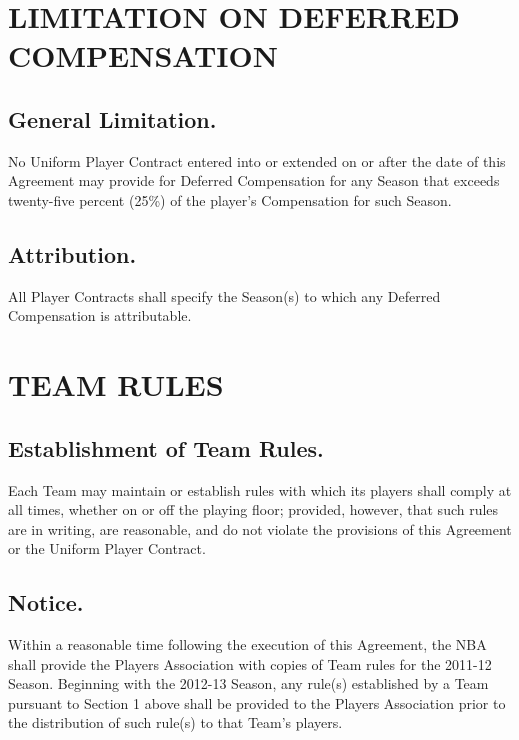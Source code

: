 \documentclass[
]{book}
\begin{document}
\hypertarget{limitation-on-deferred-compensation}{%
\chapter{LIMITATION ON DEFERRED COMPENSATION}\label{limitation-on-deferred-compensation}}

\hypertarget{general-limitation.-1}{%
\section{General Limitation.}\label{general-limitation.-1}}

No Uniform Player Contract entered into or extended on or after the date of this Agreement may provide for Deferred Compensation for any Season that exceeds twenty-five percent (25\%) of the player's Compensation for such Season.

\hypertarget{attribution.}{%
\section{Attribution.}\label{attribution.}}

All Player Contracts shall specify the Season(s) to which any Deferred Compensation is attributable.

\hypertarget{team-rules}{%
\chapter{TEAM RULES}\label{team-rules}}

\hypertarget{establishment-of-team-rules.}{%
\section{Establishment of Team Rules.}\label{establishment-of-team-rules.}}

Each Team may maintain or establish rules with which its players shall comply at all times, whether on or off the playing floor; provided, however, that such rules are in writing, are reasonable, and do not violate the provisions of this Agreement or the Uniform Player Contract.

\hypertarget{notice.}{%
\section{Notice.}\label{notice.}}

Within a reasonable time following the execution of this Agreement, the NBA shall provide the Players Association with copies of Team rules for the 2011-12 Season. Beginning with the 2012-13 Season, any rule(s) established by a Team pursuant to Section 1 above shall be provided to the Players Association prior to the distribution of such rule(s) to that Team's players.
\end{document}
